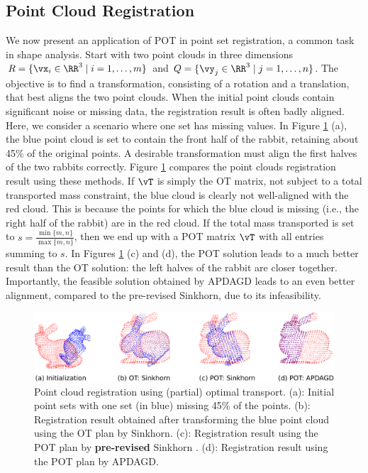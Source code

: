 \subsection{Point Cloud Registration}
We now present an application of POT in point set registration, a common task in shape analysis. Start with two point clouds in three dimensions $R = \{ \vx_i \in \RR^3 \mid i = 1, \ldots, m \}$ and $Q = \{ \vy_j \in \RR^3 \mid j = 1, \ldots, n \}$. The objective is to find a transformation, consisting of a rotation and a translation, that best aligns the two point clouds. When the initial point clouds contain significant noise or missing data, the registration result is often badly aligned. Here, we consider a scenario where one set has missing values. In Figure \ref{fig:point_cloud} (a), the blue point cloud is set to contain the front half of the rabbit, retaining about 45\% of the original points. A desirable transformation must align the first halves of the two rabbits correctly.
Figure \ref{fig:point_cloud} compares the point clouds registration result using these methods. If $\vT$ is simply the OT matrix, not subject to a total transported mass constraint, the blue cloud is clearly not well-aligned with the red cloud. This is because the points for which the blue cloud is missing (i.e., the right half of the rabbit) are in the red cloud. If the total mass transported is set to $s = \frac{\min\{m, n\}}{\max\{m, n\}}$, then we end up with a POT matrix $\vT$ with all entries summing to $s$. In Figures \ref{fig:point_cloud} (c) and (d), the POT solution leads to a much better result than the OT solution: the left halves of the rabbit are closer together. Importantly, the feasible solution obtained by APDAGD leads to an even better alignment, compared to the pre-revised Sinkhorn, due to its infeasibility.

\begin{figure}
    \centering
    \includegraphics[width=1\linewidth]{figs/point_clouds.png}
    \caption{Point cloud registration using (partial) optimal transport. (a): Initial point sets with one set (in blue) missing 45\% of the points. (b): Registration result obtained after transforming the blue point cloud using the OT plan by Sinkhorn. (c): Registration result using the POT plan by \textbf{pre-revised} Sinkhorn \cite{nhatho-mmpot}. (d): Registration result using the POT plan by APDAGD.}
    \label{fig:point_cloud}
\end{figure}

